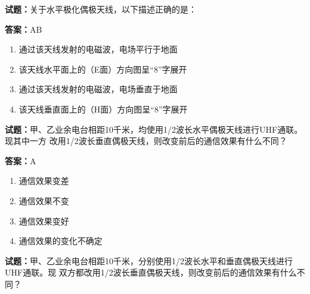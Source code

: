 \documentclass{ctexbook}
\begin{document}




\vspace{1em}

\textbf{试题：}关于水平极化偶极天线，以下描述正确的是： 

\textbf{答案：}AB 

\begin{enumerate}[leftmargin=3em]
  \item 通过该天线发射的电磁波，电场平行于地面 

  \item 该天线水平面上的（E面）方向图呈“8”字展开 

  \item 通过该天线发射的电磁波，电场垂直于地面 

  \item 该天线垂直面上的（H面）方向图呈“8”字展开 

\end{enumerate}





\vspace{1em}

\textbf{试题：}甲、乙业余电台相距10千米，均使用1/2波长水平偶极天线进行UHF通联。现其中一方
改用1/2波长垂直偶极天线，则改变前后的通信效果有什么不同？ 

\textbf{答案：}A 

\begin{enumerate}[leftmargin=3em]
  \item 通信效果变差 

  \item 通信效果不变 

  \item 通信效果变好 

  \item 通信效果的变化不确定 

\end{enumerate}





\vspace{1em}

\textbf{试题：}甲、乙业余电台相距10千米，分别使用1/2波长水平和垂直偶极天线进行UHF通联。现
双方都改用1/2波长垂直偶极天线，则改变前后的通信效果有什么不同？ 
\end{document}

